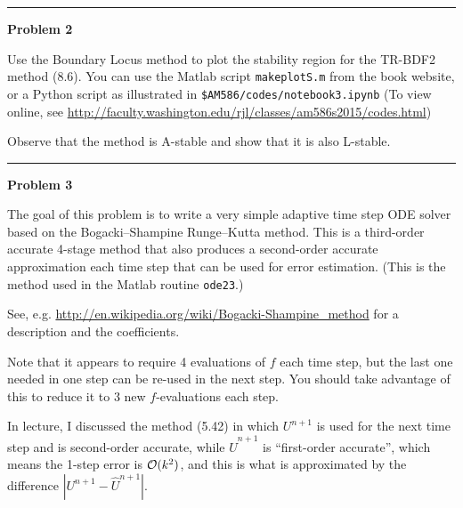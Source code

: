 \documentclass[10pt]{article}
\begin{document}


\newpage
\vskip 1cm
\hrule
{\bf Problem 2}  

Use the Boundary Locus method to plot the stability region for the TR-BDF2
method (8.6).   You can use the Matlab script \texttt{makeplotS.m}
from the book website, or a Python script as illustrated in 
{\tt \$AM586/codes/notebook3.ipynb}
(To view online, see 
\url{http://faculty.washington.edu/rjl/classes/am586s2015/codes.html})

Observe that the method is A-stable and show that it is
also L-stable.




\vskip 1cm
\hrule
{\bf Problem 3}  

The goal of this problem is to write a very simple adaptive time step ODE
solver based on the Bogacki--Shampine Runge--Kutta method.  This is a
third-order accurate 4-stage method that also produces a second-order
accurate approximation each time step that can be used for error estimation. 
(This is the method used in the Matlab routine \texttt{ode23}.)

See, e.g. \url{http://en.wikipedia.org/wiki/Bogacki-Shampine\_method}
for a description and the coefficients. 

Note that it appears to require 4 evaluations of $f$ each time step, but the
last one needed in one step can be re-used in the next step.  You should
take advantage of this to reduce it to 3 new $f$-evaluations each step.

In lecture, I discussed the method (5.42) in which $U^{n+1}$ is used for the
next time step and is second-order accurate, while $\hat U^{n+1}$ is 
``first-order accurate'', which means the 1-step error is ${\mathcal O}(k^2)$, and
this is what is approximated by the difference $|U^{n+1}-\hat U^{n+1}|$.
\end{document}
